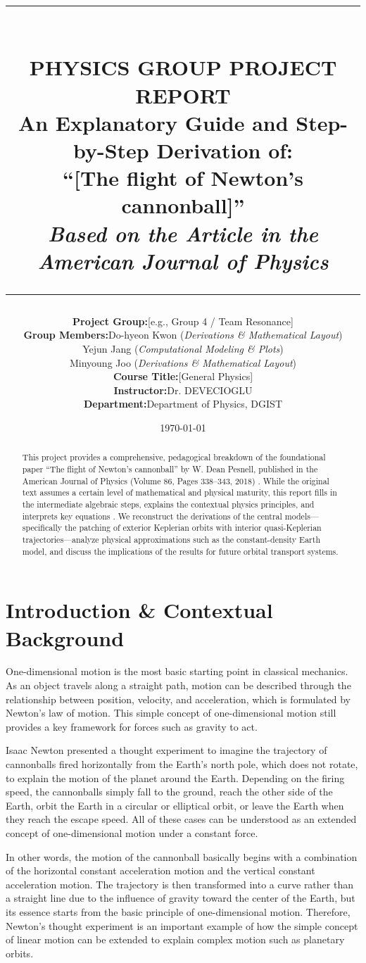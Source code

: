 \documentclass[11pt,letterpaper]{article}
\title{
\vspace{-1.5in}
\rule{\linewidth}{1.5pt} \\ \vspace{4mm}
\large\textbf{PHYSICS GROUP PROJECT REPORT} \\ \vspace{2mm}
\Large\textbf{An Explanatory Guide and Step-by-Step
Derivation of: \\ ``[The flight of Newton's cannonball]''}
\\ \vspace{4mm}
\large\textit{Based on the Article in the American Journal of
Physics} \\
\rule{\linewidth}{1.5pt}
}
\author{
\begin{tabular}{r @{\quad} l}
\textbf{Project Group:} & [e.g., Group 4 / Team
Resonance] \\[1ex]
\textbf{Group Members:} & Do-hyeon Kwon
(\textit{Derivations \& Mathematical Layout}) \\
& Yejun Jang (\textit{Computational Modeling \& Plots}) \\
& Minyoung Joo (\textit{Derivations \& Mathematical Layout}) \\[1ex]
\textbf{Course Title:}  & [General Physics] \\
\textbf{Instructor:}    & Dr. DEVECIOGLU  \\
\textbf{Department:}    & Department of Physics, DGIST
\end{tabular}
}
\date{\today}
\begin{document}
\maketitle
\begin{abstract}
This project provides a comprehensive, pedagogical breakdown of the foundational paper “The flight of Newton’s cannonball” by W. Dean Pesnell, published in the American Journal of Physics (Volume 86, Pages 338–343, 2018)
. While the original text assumes a certain level of mathematical and physical maturity, this report fills in the intermediate algebraic steps, explains the contextual physics principles, and interprets key equations
. We reconstruct the derivations of the central models—specifically the patching of exterior Keplerian orbits with interior quasi-Keplerian trajectories—analyze physical approximations such as the constant-density Earth model, and discuss the implications of the results for future orbital transport systems.
\end{abstract}
\tableofcontents
\newpage
\section{Introduction \& Contextual Background}
One-dimensional motion is the most basic starting point in classical mechanics. As an object travels along a straight path, motion can be described through the relationship between position, velocity, and acceleration, which is formulated by Newton's law of motion. This simple concept of one-dimensional motion still provides a key framework for forces such as gravity to act.

Isaac Newton presented a thought experiment to imagine the trajectory of cannonballs fired horizontally from the Earth's north pole, which does not rotate, to explain the motion of the planet around the Earth. Depending on the firing speed, the cannonballs simply fall to the ground, reach the other side of the Earth, orbit the Earth in a circular or elliptical orbit, or leave the Earth when they reach the escape speed. All of these cases can be understood as an extended concept of one-dimensional motion under a constant force.

In other words, the motion of the cannonball basically begins with a combination of the horizontal constant acceleration motion and the vertical constant acceleration motion. The trajectory is then transformed into a curve rather than a straight line due to the influence of gravity toward the center of the Earth, but its essence starts from the basic principle of one-dimensional motion. Therefore, Newton's thought experiment is an important example of how the simple concept of linear motion can be extended to explain complex motion such as planetary orbits.
\end{document}
